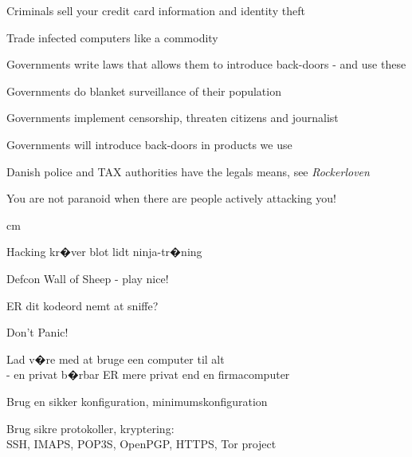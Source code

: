 \documentclass[20pt,landscape,a4paper,footrule]{foils}
\begin{document}

\begin{list2}
\item Criminals sell your credit card information and identity theft
\item Trade infected computers like a commodity
\item Governments write laws that allows them to introduce back-doors - and use these
\item Governments do blanket surveillance of their population
\item Governments implement censorship, threaten citizens and journalist
\item Governments will introduce back-doors in products we use
\item Danish police and TAX authorities have the legals means, see \emph{Rockerloven}
\end{list2}

\vskip 1cm
\centerline{You are not paranoid when there are people actively attacking you!}






 cm
\centerline{Hacking kr�ver blot lidt ninja-tr�ning}



\begin{center}
Defcon Wall of Sheep - play nice!\\
\end{center}

ER dit kodeord nemt at sniffe?




\centerline{\color{titlecolor}\LARGE Don't Panic!}

\begin{list1}
\item Lad v�re med at bruge een computer til alt\\
- en privat b�rbar ER mere privat end en firmacomputer
\item Brug en sikker konfiguration, minimumskonfiguration
\item Brug sikre protokoller, kryptering:\\
 SSH, IMAPS, POP3S, OpenPGP, HTTPS, Tor project
\end{list1}
\end{document}
